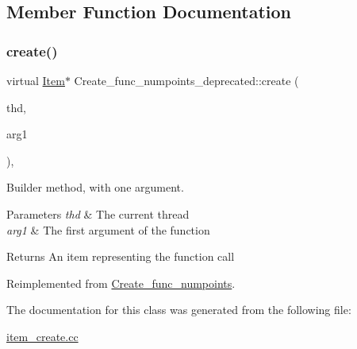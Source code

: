 \subsection{Member Function Documentation}
\mbox{\label{classCreate__func__numpoints__deprecated_aa1535981a4695ba9499044699b0952e3}} 
\subsubsection{\texorpdfstring{create()}{create()}}
{\footnotesize\ttfamily virtual \mbox{\hyperlink{classItem}{Item}}$\ast$ Create\+\_\+func\+\_\+numpoints\+\_\+deprecated\+::create (\begin{DoxyParamCaption}\item[{T\+HD $\ast$}]{thd,  }\item[{\mbox{\hyperlink{classItem}{Item}} $\ast$}]{arg1 }\end{DoxyParamCaption})\hspace{0.3cm}{\ttfamily [inline]}, {\ttfamily [virtual]}}

Builder method, with one argument. 
\begin{DoxyParams}{Parameters}
{\em thd} & The current thread \\
\hline
{\em arg1} & The first argument of the function \\
\hline
\end{DoxyParams}
\begin{DoxyReturn}{Returns}
An item representing the function call 
\end{DoxyReturn}


Reimplemented from \mbox{\hyperlink{classCreate__func__numpoints_a11173c776240d156218d2605cc51379d}{Create\+\_\+func\+\_\+numpoints}}.



The documentation for this class was generated from the following file\+:\begin{DoxyCompactItemize}
\item 
\mbox{\hyperlink{item__create_8cc}{item\+\_\+create.\+cc}}\end{DoxyCompactItemize}
